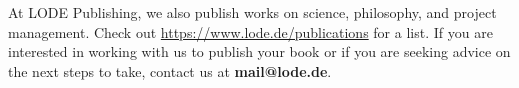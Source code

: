 At LODE Publishing, we also publish works on science, philosophy, and project management. Check out \url{https://www.lode.de/publications} for a list. If you are interested in working with us to publish your book or if you are seeking advice on the next steps to take, contact us at \textbf{mail@lode.de}.